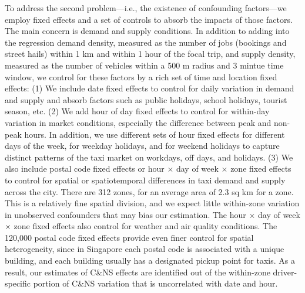 \documentclass[reviewmode,AEJ]{AEA}
\begin{document}
To address the second problem---i.e., the existence of confounding factors---we employ fixed effects and a
set of controls to absorb the impacts of those factors. The main concern is demand and supply conditions.
In addition to adding  into the regression demand density, measured as the number of jobs (bookings and street 
hails) within 1 km and within 1 hour of the focal trip, and supply density, measured as the number of vehicles
within a 500 m radius and 3 mintue time window, we control for these factors by a rich set of time and
location fixed effects: (1) We include date fixed effects to control for daily variation in demand and 
supply and absorb factors such as public holidays, school holidays, tourist season, etc. (2) We add hour 
of day fixed effects to control for within-day variation in market conditions, especially the difference 
between peak and non-peak hours. In addition, we use different sets of hour fixed effects for different days 
of the week, for weekday holidays, and for weekend holidays to capture distinct patterns of the taxi market on 
workdays, off days, and holidays. (3)  We also include postal code fixed effects or hour $\times$ day of week
$\times$ zone fixed effects to control for spatial or spatiotemporal differences in taxi demand and supply
across the city. There are 312 zones, for an average area of 2.3 sq km for a zone. This is a relatively fine
spatial division, and we expect little within-zone variation in unobserved confounders that may bias our 
estimation. The  hour $\times$ day of week $\times$ zone fixed effects also control for weather and air 
quality conditions. The 120,000 postal code fixed effects provide even finer control for spatial 
heterogeneity, since in Singapore each postal code is associated with a unique building, and each building
usually has a designated pickup point for taxis. As a result, our estimates of C\&NS effects are identified 
out of the within-zone driver-specific portion of C\&NS variation that is uncorrelated with date and hour. 
\end{document}
